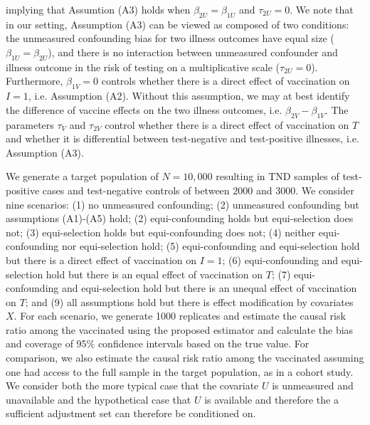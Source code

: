 \documentclass[11pt]{article}
\begin{document}
implying that Assumtion (A3) holds when $\beta_{2U}=\beta_{1U}$ and $\tau_{2U}=0$. We note that in our setting, Assumption (A3) can be viewed as composed of two conditions: the unmeasured confounding bias for two illness outcomes have equal size ($\beta_{1U}=\beta_{2U}$), and there is no interaction between unmeasured confounder and illness outcome in the risk of testing on a multiplicative scale ($\tau_{2U}=0$). Furthermore, $\beta_{1V}=0$ controls whether there is a direct effect of vaccination on $I = 1$, i.e. Assumption (A2). Without this assumption, we may at best identify the difference of vaccine effects on the two illness outcomes, i.e. $\beta_{2V}-\beta_{1V}$. The parameters $\tau_V$ and $\tau_{2V}$ control whether there is a direct effect of vaccination on $T$ and whether it is differential between test-negative and test-positive illnesses, i.e. Assumption (A3).%

We generate a target population of $N = 10,000$ resulting in TND samples of test-positive cases and test-negative controls of between $2000$ and $3000$. We consider nine scenarios: (1) no unmeasured confounding; (2) unmeasured confounding but assumptions (A1)-(A5) hold; (2) equi-confounding holds but equi-selection does not; (3) equi-selection holds but equi-confounding does not; (4) neither equi-confounding nor equi-selection hold; (5) equi-confounding and equi-selection hold but there is a direct effect of vaccination on $I = 1$; (6) equi-confounding and equi-selection hold but there is an equal effect of vaccination on $T$; (7) equi-confounding and equi-selection hold but there is an unequal effect of vaccination on $T$; and (9) all assumptions hold but there is effect modification by covariates $X$. For each scenario, we generate 1000 replicates and estimate the causal risk ratio among the vaccinated using the proposed estimator and calculate the bias and coverage of 95\% confidence intervals based on the true value. For comparison, we also estimate the causal risk ratio among the vaccinated assuming one had access to the full sample in the target population, as in a cohort study. We consider both the more typical case that the covariate $U$ is unmeasured and unavailable and the hypothetical case that $U$ is available and therefore the a sufficient adjustment set can therefore be conditioned on. 
\end{document}
